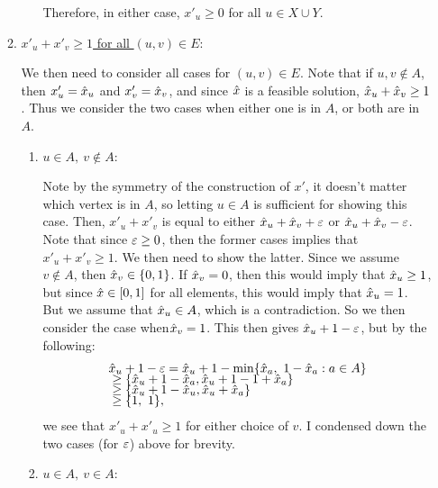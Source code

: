 \begin{solution}
\begin{enumerate}
\begin{enumerate}
\begin{enumerate}
                \jump
                Therefore, in either case, $x'_u \geq 0$ for all $u \in X\cup Y$.
            \end{enumerate}

            \newpage
            \item \underline{$x'_u + x'_v \geq 1$ for all $(u, v) \in E$}:

            \hop
            We then need to consider all cases for $(u, v) \in E$. Note that if $u, v \not \in A$, then $x'_u = \hat{x}_u$ and $x'_v = \hat{x}_v$, and since $\hat{x}$ is a feasible solution, $\hat{x}_u + \hat{x}_v \geq 1$. Thus we consider the two cases when either one is in $A$, or both are in $A$. 

            \begin{enumerate}
                \item \underline{$u \in A, \ v \not \in A$}:

                \hop
                Note by the symmetry of the construction of $x'$, it doesn't matter which vertex is in $A$, so letting $u \in A$ is sufficient for showing this case. Then, $x'_u + x'_v$ is equal to either $\hat{x}_u + \hat{x}_v + \varepsilon$ or $\hat{x}_u + \hat{x}_v - \varepsilon$. Note that since $\varepsilon \geq 0$, then the former cases implies that $x'_u + x'_v \geq 1$. We then need to show the latter. Since we assume $v \not \in A$, then $\hat{x}_v \in \{0, 1\}$. If $\hat{x}_v = 0$, then this would imply that $\hat{x}_u \geq 1$, but since $\hat{x} \in [0, 1]$ for all elements, this would imply that $\hat{x}_u = 1$. But we assume that $\hat{x}_u \in A$, which is a contradiction. So we then consider the case when$\hat{x}_v = 1$. This then gives $\hat{x}_u + 1 - \varepsilon$, but by the following:
                \begin{align*}
                    &\hat{x}_u + 1 - \varepsilon = \hat{x}_u + 1 - \min\{\hat{x}_a, \ 1 - \hat{x}_a : a \in A\} \\[-1.5ex]
                    &\geq \{\hat{x}_u + 1 - \hat{x}_a, \hat{x}_u + 1 - 1 + \hat{x}_a\}                  \\[-1.5ex]
                    &\geq \{\hat{x}_u + 1 - \hat{x}_u, \hat{x}_u + \hat{x}_a\}                          \\[-1.5ex]
                    &\geq \{1, \ 1\},   
                \end{align*}
                 we see that $x'_u + x'_u \geq 1$ for either choice of $v$. I condensed down the two cases (for $\varepsilon$) above for brevity. 

                 \item \underline{$u \in A, \ v \in A$}:


\end{enumerate}
\end{enumerate}
\end{enumerate}
\end{solution}
